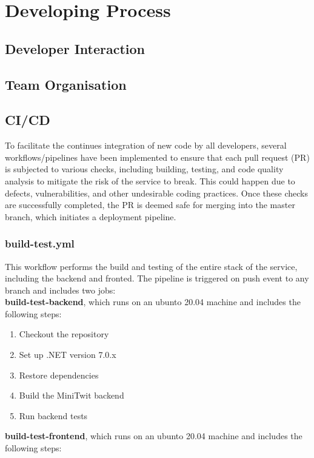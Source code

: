 \chapter{Developing Process}

\section{Developer Interaction}

\section{Team Organisation}

\section{CI/CD}
To facilitate the continues integration of new code by all developers, several workflows/pipelines have been implemented to ensure that each pull request (PR) is subjected to various checks, including building, testing, and code quality analysis to mitigate the risk of the service to break. This could happen due to defects, vulnerabilities, and other undesirable coding practices. Once these checks are successfully completed, the PR is deemed safe for merging into the master branch, which initiates a deployment pipeline.

\subsection{build-test.yml}
This workflow performs the build and testing of the entire stack of the service, including the backend and fronted. The pipeline is triggered on push event to any branch and includes two jobs: \\

\textbf{build-test-backend}, which runs on an ubunto 20.04 machine and includes the following steps:

\begin{enumerate}
    \item Checkout the repository
    \item Set up .NET version 7.0.x
    \item Restore dependencies
    \item Build the MiniTwit backend
    \item Run backend tests
\end{enumerate}

\textbf{build-test-frontend}, which runs on an ubunto 20.04 machine and includes the following steps:

